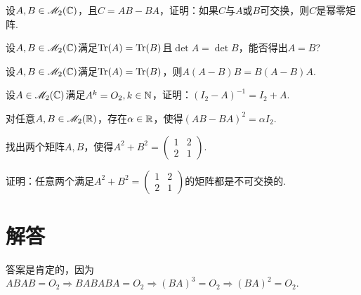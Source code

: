 \begin{mybox}
  \begin{problem}[Jacobson引理.]

    设$A,B\in\mathscr M_2(\mathbb C)$，且$C=AB-BA$，证明：如果$C$与$A$或$B$可交换，则$C$是幂零矩阵.
  \end{problem}
\end{mybox}

\begin{problem}

  设$A,B\in\mathscr M_2(\mathbb C)$满足$\operatorname{Tr}(A)=\operatorname{Tr}(B)$且$\det A=\det B$，能否得出$A=B$?
\end{problem}

\begin{problem}
  设$A,B\in\mathscr M_2(\mathbb C)$满足$\operatorname{Tr}(A)=\operatorname{Tr}(B)$，则$A(A-B)B=B(A-B)A$.
\end{problem}

\begin{mybox}
  \begin{problem}
    设$A\in\mathscr M_2(\mathbb C)$满足$A^k=O_2,k\in\mathbb N$，证明：$(I_2-A)^{-1}=I_2+A$.
  \end{problem}
\end{mybox}

\begin{problem}
  对任意$A,B\in\mathscr M_2(\mathbb R)$，存在$\alpha\in\mathbb R$，使得$(AB-BA)^2=\alpha I_2$.
\end{problem}

\begin{problem}
  \begin{enuma}
    \item 找出两个矩阵$A,B$，使得$A^2+B^2=\begin{pmatrix}
      1 & 2 \\
      2 & 1
    \end{pmatrix}$.

    \item 证明：任意两个满足$A^2+B^2=\begin{pmatrix}
      1 & 2 \\
      2 & 1
    \end{pmatrix}$的矩阵都是不可交换的.
  \end{enuma}
\end{problem}

\section{解答}

\begin{solution}
  答案是肯定的，因为$ABAB=O_2\Rightarrow BABABA=O_2
  \Rightarrow(BA)^3=O_2\Rightarrow(BA)^2=O_2$.
\end{solution}

